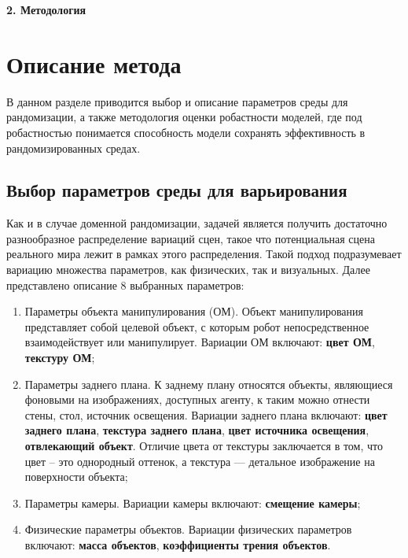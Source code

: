 \newpage
\begin{center}
  \textbf{\large 2. Методология}
\end{center}
\label{method}

\section{Описание метода}
В данном разделе приводится выбор и описание параметров среды для рандомизации, а также методология оценки робастности моделей, где под робастностью понимается способность модели сохранять эффективность в рандомизированных средах.

    \subsection{Выбор параметров среды для варьирования}

        Как и в случае доменной рандомизации, задачей является получить достаточно разнообразное распределение вариаций сцен, такое что потенциальная сцена реального мира лежит в рамках этого распределения. Такой подход подразумевает вариацию множества параметров, как физических, так и визуальных. Далее представлено описание 8 выбранных параметров:

        \begin{enumerate}
            \item Параметры объекта манипулирования (ОМ). Объект манипулирования представляет собой целевой объект, с которым робот непосредственное взаимодействует или манипулирует. Вариации ОМ включают: \textbf{цвет ОМ}, \textbf{текстуру ОМ};

            \item Параметры заднего плана. К заднему плану относятся объекты, являющиеся фоновыми на изображениях, доступных агенту, к таким можно отнести стены, стол, источник освещения. Вариации заднего плана включают: \textbf{цвет заднего плана}, \textbf{текстура заднего плана}, \textbf{цвет источника освещения}, \textbf{отвлекающий объект}. Отличие цвета от текстуры заключается в том, что цвет -- это однородный оттенок, а текстура — детальное изображение на поверхности объекта;

            \item Параметры камеры. Вариации камеры включают: \textbf{смещение камеры};

            \item Физические параметры объектов. Вариации физических параметров включают: \textbf{масса объектов}, \textbf{коэффициенты трения объектов}.
        \end{enumerate}

